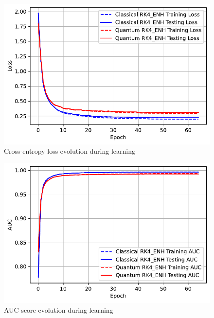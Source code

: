 \documentclass[]{beamer}
\begin{document}
\begin{frame}
  \begin{figure}[th]
    \centering
    \includegraphics[scale=0.7]{./pics/new_pdf_graphs/hybrid/alternative_hybrid_transfomer_loss_mnist_rk4_enh.pdf}
    \caption[Cross-entropy loss evolution during learning]{Cross-entropy loss evolution during learning}
    \label{fig:p26}
  \end{figure}
\end{frame}

\begin{frame}
  \begin{figure}
    \includegraphics[scale=0.7]{./pics/new_pdf_graphs/hybrid/hybrid_auc_mnist_rk4.pdf}
    \caption[AUC score evolution during learning]{AUC score evolution during learning}
    \label{fig:p27}
  \end{figure}
\end{frame}
\end{document}
